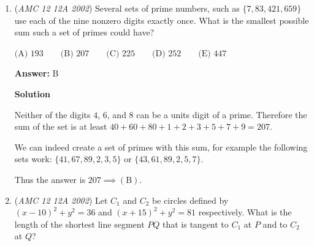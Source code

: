 \begin{enumerate}
 Sergio never wins when choosing $1$ so the probability is $\frac49 \cdot \frac{9}{10} + (0)\frac{1}{10} = \boxed{\textbf{(A)} \frac{2}{5}}.$




\textbf{Solution 5 (Brute Force)}

List all the cases where $S \in [1, 10]$ and you get $\frac{0+0+0+1+2+4+6+8+9+10}{\binom{5}{2} \cdot 10} = \boxed{\textbf{(A)} \frac{2}{5}}$




\textbf{Solution 6 (Cheese)}

Add up the first set and then divide by $5$ and you get $3$. Multiply this by two and you can see the expected value of the sum is $6$. There is a $\frac{2}{5}$ chance you will get a number higher this is great if you are running low on time.

 (Note: this method only works because Tina's largest value ($9$) is less than Sergio's ($10$). If Sergio chose a random number from a set like $\{1, 2, 3, 4, 5, 6, 7\}$, this method gives an answer of $14.3 \%$ whereas the actual answer would be $18.6 \%$.)

 



\textbf{Solution}





	\item (\textit{AMC 12 12A 2002}) Several sets of prime numbers, such as $\{7,83,421,659\}$ use each of the nine nonzero digits exactly once. What is the smallest possible sum such a set of primes could have?


 $\text{(A) }193 \qquad \text{(B) }207 \qquad \text{(C) }225 \qquad \text{(D) }252 \qquad \text{(E) }447$

 \textbf{Answer: }B



\textbf{Solution}

Neither of the digits $4$, $6$, and $8$ can be a units digit of a prime. Therefore the sum of the set is at least $40 + 60 + 80 + 1 + 2 + 3 + 5 + 7 + 9 = 207$.

 We can indeed create a set of primes with this sum, for example the following sets work: $\{ 41, 67, 89, 2, 3, 5 \}$ or $\{ 43, 61, 89, 2, 5, 7 \}$.

 Thus the answer is $207\implies \boxed{\mathrm{(B)}}$.

 


	\item (\textit{AMC 12 12A 2002}) Let $C_1$ and $C_2$ be circles defined by $(x-10)^2 + y^2 = 36$ and $(x+15)^2 + y^2 = 81$
respectively. What is the length of the shortest line segment $PQ$ that is tangent to $C_1$ at $P$ and to $C_2$ at $Q$?



\end{enumerate}
